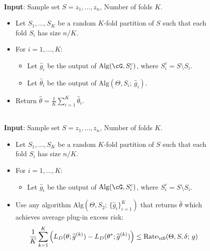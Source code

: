 \documentclass[11pt]{article} %
\theoremstyle{theorem}  %
\theoremstyle{plain}
\newcommand{\wh}[1]{\widehat{#1}}
\newcommand{\midsem}{;\,}
\newcommand{\estone}{\wh{g}}
\newcommand{\esttwo}{\wh{\theta}}
\newcommand{\nuisance}{\cG}
\newcommand{\target}{\Theta}
\newcommand{\Rate}{\mathrm{Rate}_{\cD}}
\newcommand{\sampletwo}{S_2}
\renewcommand{\hat}[1]{\wh{#1}}
\begin{document}
\begin{figure}[H]
\begin{framedmetaalgorithm}~\\
\textbf{Input}: Sample set $S=z_1,\ldots,z_n$, Number of folds $K$.
\begin{itemize}
\item Let $S_1,\ldots,S_K$ be a random $K$-fold partition of $S$ such that each fold $S_i$ has size $n/K$.
  \item For $i=1,\ldots,K$:
    \begin{itemize}
    \item Let $\estone_i$ be the output of $\mathrm{Alg}(\nuisance,S_i^{c})$, where $S_i^{c}=S\setminus{}S_i$.
    \item Let $\esttwo_i$ be the output of $\mathrm{Alg}(\target,S_i\midsem\estone_i)$.
    \end{itemize}
  \item Return $\esttwo = \frac{1}{K}\sum_{i=1}^{K}\esttwo_i$.
\end{itemize}
\label{alg:cross_fitting}
\end{framedmetaalgorithm}
\end{figure}
\vspace{-10pt}
\begin{figure}[H]
\begin{framedmetaalgorithm}~\\
\textbf{Input}: Sample set $S=z_1,\ldots,z_n$, Number of folds $K$.
\begin{itemize}
\item Let $S_1,\ldots,S_K$ be a random $K$-fold partition of $S$ such that each fold $S_i$ has size $n/K$.
  \item For $i=1,\ldots,K$:
    \begin{itemize}
    \item Let $\estone_i$ be the output of $\mathrm{Alg}(\nuisance,S_i^{c})$, where $S_i^{c}=S\setminus{}S_i$.
%
    \end{itemize}
  \item Use any algorithm $\mathrm{Alg}(\target,\sampletwo\midsem \{\estone_i\}_{i=1}^K)$ that returns $\esttwo$ which achieves average plug-in excess risk:
  \begin{align}
    \frac{1}{K} \sum_{k=1}^K \left( L_D(\theta; \hat{g}^{(k)}) -L_D(\theta^*; \hat{g}^{(k)})\right) \leq \Rate(\target,  S, \delta\midsem{}g)
    \end{align}
\end{itemize}
\label{alg:cross_fitting2}
\end{framedmetaalgorithm}
\end{figure}
\end{document}
